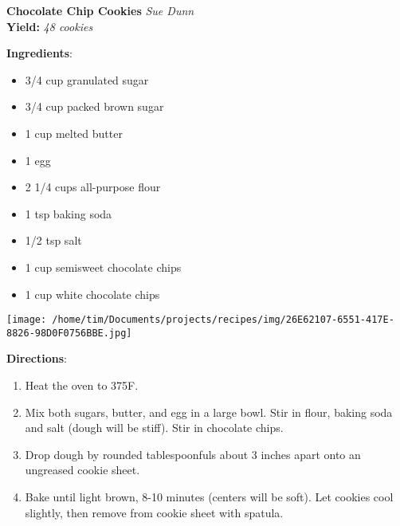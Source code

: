 \documentclass[11pt, twoside, openany]{book}
\begin{document}
\noindent\begin{minipage}[t]{\linewidth}%
{\Large\textbf{Chocolate Chip Cookies}} \label{chocolate-chip-cookies}\hfill\textit{Sue Dunn}\\
\textbf{Yield:} \textit{48 cookies}\\
\noindent\begin{minipage}[t]{0.78\linewidth}%
\textbf{Ingredients}:\vspace{-3mm}
\begin{multicols}{2}
\begin{itemize}\setlength\itemsep{-1mm}
\item 3/4 cup granulated sugar
\item 3/4 cup packed brown sugar
\item 1 cup melted butter
\item 1 egg
\item 2 1/4 cups all-purpose flour
\item 1 tsp baking soda
\item 1/2 tsp salt
\item 1 cup semisweet chocolate chips
\item 1 cup white chocolate chips
\end{itemize}
\end{multicols}
\end{minipage}
\noindent\begin{minipage}[t]{0.18\linewidth}
\centering \strut\vspace*{-\baselineskip}\newline
\texttt{[image: /home/tim/Documents/projects/recipes/img/26E62107-6551-417E-8826-98D0F0756BBE.jpg]}\\
\end{minipage}\vspace{3mm}
\textbf{Directions}:
\vspace{-3mm}\begin{enumerate}\setlength\itemsep{-1mm}
\item Heat the oven to 375F. 
\item Mix both sugars, butter, and egg in a large bowl. Stir in flour, baking soda and salt (dough will be stiff). Stir in chocolate chips.
\item Drop dough by rounded tablespoonfuls about 3 inches apart onto an ungreased cookie sheet. 
\item Bake until light brown, 8-10 minutes (centers will be soft). Let cookies cool slightly, then remove from cookie sheet with spatula.
\end{enumerate}
\end{minipage}\vspace{8mm}
\end{document}
